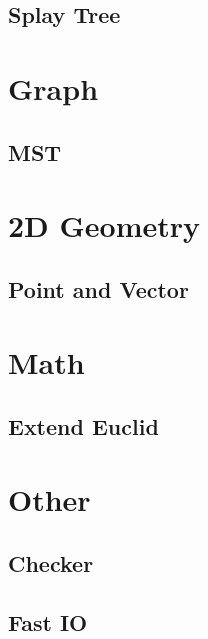 \documentclass[twoside]{article}
\begin{document}
		\subsection{Splay Tree}
			
	\newpage
	\section{Graph}
		\subsection{MST}
	\newpage
	\section{2D Geometry}
		\subsection{Point and Vector}
	\newpage
	\section{Math}
		\subsection{Extend Euclid}
	\newpage
	\section{Other}
		\subsection{Checker}
			
		\subsection{Fast IO}
			
\end{document}

